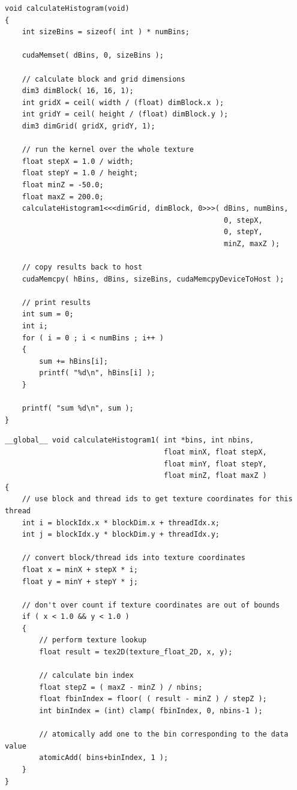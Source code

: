 \documentclass{article}
\begin{document}
\lstset{language=C,basicstyle=\footnotesize}
\begin{minipage}{\textwidth}
\begin{lstlisting}[caption={CUDA Kernel Launch and Result Retrieval Routine},label={calc1}]
void calculateHistogram(void)
{
    int sizeBins = sizeof( int ) * numBins;

    cudaMemset( dBins, 0, sizeBins );

    // calculate block and grid dimensions
    dim3 dimBlock( 16, 16, 1);
    int gridX = ceil( width / (float) dimBlock.x );
    int gridY = ceil( height / (float) dimBlock.y );
    dim3 dimGrid( gridX, gridY, 1);

    // run the kernel over the whole texture
    float stepX = 1.0 / width;
    float stepY = 1.0 / height;
    float minZ = -50.0;
    float maxZ = 200.0;
    calculateHistogram1<<<dimGrid, dimBlock, 0>>>( dBins, numBins,
                                                   0, stepX,
                                                   0, stepY,
                                                   minZ, maxZ );

    // copy results back to host
    cudaMemcpy( hBins, dBins, sizeBins, cudaMemcpyDeviceToHost );

    // print results
    int sum = 0;
    int i;
    for ( i = 0 ; i < numBins ; i++ )
    {
        sum += hBins[i];
        printf( "%d\n", hBins[i] );
    }

    printf( "sum %d\n", sum );
}
\end{lstlisting}
\end{minipage}

\lstset{language=C,basicstyle=\footnotesize}
\begin{minipage}{\textwidth}
\begin{lstlisting}[caption={Global Memory atomicAdd kernel},label={kernel1}]
__global__ void calculateHistogram1( int *bins, int nbins,
                                     float minX, float stepX,
                                     float minY, float stepY,
                                     float minZ, float maxZ )
{
    // use block and thread ids to get texture coordinates for this thread
    int i = blockIdx.x * blockDim.x + threadIdx.x;
    int j = blockIdx.y * blockDim.y + threadIdx.y;

    // convert block/thread ids into texture coordinates
    float x = minX + stepX * i;
    float y = minY + stepY * j;

    // don't over count if texture coordinates are out of bounds
    if ( x < 1.0 && y < 1.0 )
    {
        // perform texture lookup
        float result = tex2D(texture_float_2D, x, y);
    
        // calculate bin index
        float stepZ = ( maxZ - minZ ) / nbins;
        float fbinIndex = floor( ( result - minZ ) / stepZ );
        int binIndex = (int) clamp( fbinIndex, 0, nbins-1 );
    
        // atomically add one to the bin corresponding to the data value
        atomicAdd( bins+binIndex, 1 );
    }
}
\end{lstlisting}
\end{minipage}
\end{document}
